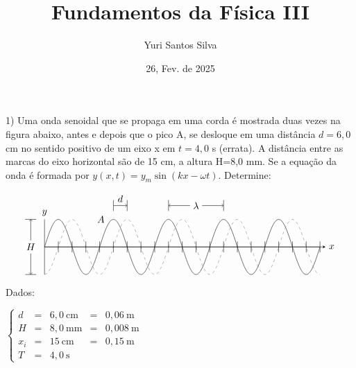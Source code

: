 \documentclass[12pt,a4paper]{article}
\title{Fundamentos da Física III}
\author{Yuri Santos Silva}
\date{26, Fev. de 2025}
\begin{document}
  \maketitle

  1) Uma onda senoidal que se propaga em uma corda é mostrada duas vezes na 
  figura abaixo, antes e depois que o pico A, se desloque em uma distância 
  $d= 6,0$ cm no sentido positivo de um eixo x em $t = 4,0$ s (errata). A distância entre as 
  marcas do eixo horizontal são de 15 cm, a altura H=8,0 mm. Se a equação da 
  onda é formada por $y(x,t)=y_m \sin(kx - \omega t)$. Determine:

  \[
    \begin{tikzpicture}[domain=0:10]
      \draw[] plot[samples=100,smooth]({\x},{sin(\x * pi r)});
      \draw[dashed,gray] plot[samples=100,smooth]({\x},{-cos(\x * pi r)});

      \draw[] (0,0) -- (10,0);
      \draw[] (0,-1) -- (0,1) node[anchor=south] {$y$};
      \draw[->,>=stealth] (0,0) -- (10.2,0) node[anchor=west] {$x$};

      \foreach \x in {0.5,1,...,10}
        \draw (\x,.2) -- (\x,-.2);

      \draw[<->] (-.5,-1) -- (-.5,1) node[midway,fill=white] {$H$};
      \draw (-.7,1) -- (-.3,1);
      \draw (-.7,-1) -- (-.3,-1);
      
      \draw[->] (2.5,1.5) -- (3,1.5) node[anchor=south,midway] {$d$};
      \draw[] (2.5,1.7) -- (2.5,1.3);
      \draw[] (3,1.7) -- (3,1.3);

      \draw[<->] (4.5,1.5) -- (6.5,1.5) node[midway,fill=white] {$\lambda$};
      \draw[] (6.5,1.7) -- (6.5,1.3);
      \draw[] (4.5,1.7) -- (4.5,1.3);

      

      \node[anchor=east] at (2.3,1) {$A$};

    \end{tikzpicture}
  \]

  Dados:
  \vspace*{.2cm}

  \(
    \left\{
        \begin{array}{cclcl}
          d & = & 6,0\ \text{cm} & = & 0,06\ \text{m} \\
          H & = & 8,0\ \text{mm} & = & 0,008\ \text{m} \\
          x_i & = & 15\ \text{cm} & = & 0,15\ \text{m} \\
          T & = & 4,0\ \text{s}
        \end{array}
    \right.
  \)
  \vspace*{.5cm}
\end{document}
